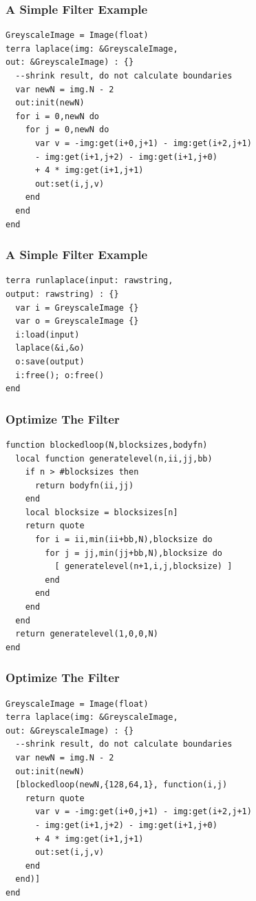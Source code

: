 \documentclass{beamer}
\begin{document}
\begin{frame}[fragile]
  \frametitle{A Simple Filter Example}
  \begin{lstlisting}
GreyscaleImage = Image(float)
terra laplace(img: &GreyscaleImage,
out: &GreyscaleImage) : {}
  --shrink result, do not calculate boundaries
  var newN = img.N - 2
  out:init(newN)
  for i = 0,newN do
    for j = 0,newN do
      var v = -img:get(i+0,j+1) - img:get(i+2,j+1)
      - img:get(i+1,j+2) - img:get(i+1,j+0)
      + 4 * img:get(i+1,j+1)
      out:set(i,j,v)
    end
  end
end
  \end{lstlisting}
\end{frame}

\begin{frame}[fragile]
	\frametitle{A Simple Filter Example}
  \begin{lstlisting}
terra runlaplace(input: rawstring,
output: rawstring) : {}
  var i = GreyscaleImage {}
  var o = GreyscaleImage {}
  i:load(input)
  laplace(&i,&o)
  o:save(output)
  i:free(); o:free()
end
  \end{lstlisting}
\end{frame}

\begin{frame}[fragile]
	\frametitle{Optimize The Filter}
  \begin{lstlisting}
function blockedloop(N,blocksizes,bodyfn)
  local function generatelevel(n,ii,jj,bb)
    if n > #blocksizes then
      return bodyfn(ii,jj)
    end
    local blocksize = blocksizes[n]
    return quote
      for i = ii,min(ii+bb,N),blocksize do
        for j = jj,min(jj+bb,N),blocksize do
          [ generatelevel(n+1,i,j,blocksize) ]
        end
      end
    end
  end
  return generatelevel(1,0,0,N)
end
  \end{lstlisting}
\end{frame}

\begin{frame}[fragile]
	\frametitle{Optimize The Filter}
  \begin{lstlisting}
GreyscaleImage = Image(float)
terra laplace(img: &GreyscaleImage,
out: &GreyscaleImage) : {}
  --shrink result, do not calculate boundaries
  var newN = img.N - 2
  out:init(newN)
  [blockedloop(newN,{128,64,1}, function(i,j)
    return quote
      var v = -img:get(i+0,j+1) - img:get(i+2,j+1)
      - img:get(i+1,j+2) - img:get(i+1,j+0)
      + 4 * img:get(i+1,j+1)
      out:set(i,j,v)
    end
  end)]
end
  \end{lstlisting}
\end{frame}
\end{document}
